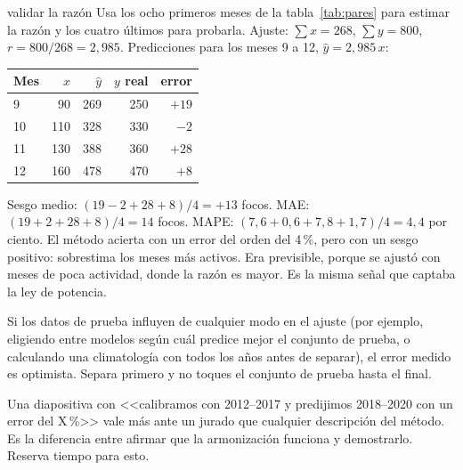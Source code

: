 \begin{ejemplo}{validar la razón}
Usa los ocho primeros meses de la tabla~\ref{tab:pares} para estimar la razón y los cuatro
últimos para probarla.
\solucion Ajuste: $\sum x = 268$, $\sum y = 800$, $r = 800/268 = 2{,}985$. Predicciones para
los meses 9 a 12, $\hat{y} = 2{,}985\,x$:
\begin{center}
\begin{tabular}{lrrrr}
\toprule
Mes & $x$ & $\hat{y}$ & $y$ real & error \\
\midrule
9 & 90 & 269 & 250 & $+19$ \\
10 & 110 & 328 & 330 & $-2$ \\
11 & 130 & 388 & 360 & $+28$ \\
12 & 160 & 478 & 470 & $+8$ \\
\bottomrule
\end{tabular}
\end{center}
Sesgo medio: $(19 - 2 + 28 + 8)/4 = +13$ focos. MAE: $(19+2+28+8)/4 = 14$ focos. MAPE:
$(7{,}6 + 0{,}6 + 7{,}8 + 1{,}7)/4 = 4{,}4$ por ciento. El método acierta con un error del orden del
4\,{}\%, pero con un sesgo positivo: sobrestima los meses más activos. Era previsible, porque se
ajustó con meses de poca actividad, donde la razón es mayor. Es la misma señal que captaba la
ley de potencia.
\end{ejemplo}

\begin{atencion}
Si los datos de prueba influyen de cualquier modo en el ajuste (por ejemplo, eligiendo entre
modelos según cuál predice mejor el conjunto de prueba, o calculando una climatología con todos
los años antes de separar), el error medido es optimista. Separa primero y no toques el conjunto
de prueba hasta el final.
\end{atencion}

\begin{parareto}
Una diapositiva con <<calibramos con 2012--2017 y predijimos 2018--2020 con un error del
X\,{}\%>> vale más ante un jurado que cualquier descripción del método. Es la diferencia entre
afirmar que la armonización funciona y demostrarlo. Reserva tiempo para esto.
\end{parareto}

\resumen

